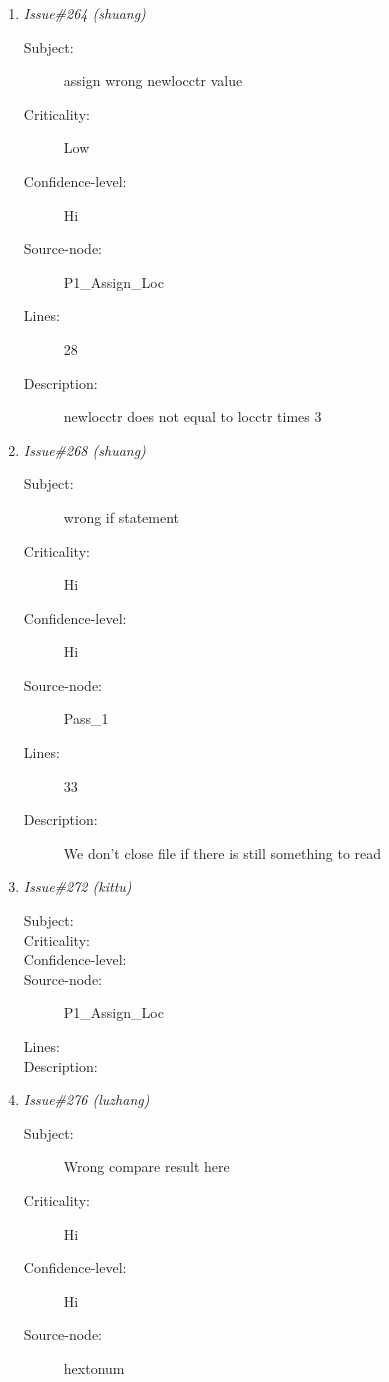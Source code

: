 \begin{enumerate}
\begin{description}
\item [Lines:] 17

\item [Description:] Here wrong compared result will encounted.
It assign TABLFULL value to symtabret.
\end{description}
\item {\it Issue\#264 (shuang)}
\begin{description}
\item [Subject:] assign wrong newlocctr value
\item [Criticality:] Low
\item [Confidence-level:] Hi
\item [Source-node:] P1\_Assign\_Loc

\item [Lines:] 28

\item [Description:] newlocctr does not equal to locctr times 3
\end{description}
\item {\it Issue\#268 (shuang)}
\begin{description}
\item [Subject:] wrong if statement
\item [Criticality:] Hi
\item [Confidence-level:] Hi
\item [Source-node:] Pass\_1

\item [Lines:] 33

\item [Description:] We don't close file if there is still
something to read
\end{description}
\item {\it Issue\#272 (kittu)}
\begin{description}
\item [Subject:] 
\item [Criticality:] 
\item [Confidence-level:] 
\item [Source-node:] P1\_Assign\_Loc

\item [Lines:] 

\item [Description:] 
\end{description}
\item {\it Issue\#276 (luzhang)}
\begin{description}
\item [Subject:] Wrong compare result here
\item [Criticality:] Hi
\item [Confidence-level:] Hi
\item [Source-node:] hextonum


\end{description}
\end{enumerate}
